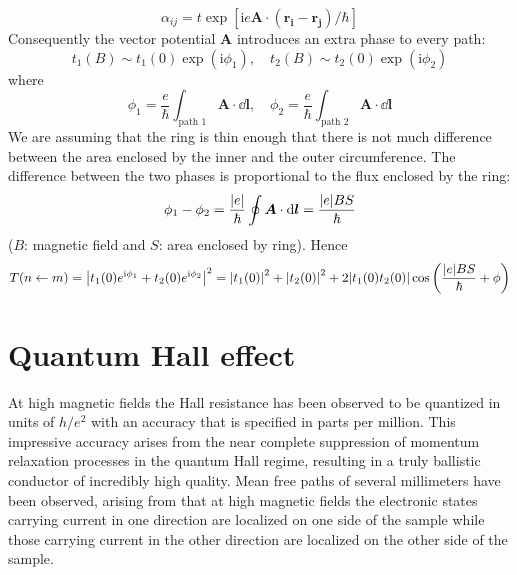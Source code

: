 \documentclass[11pt,a4paper]{book}
\theoremstyle{plain}
\theoremstyle{definition}
\theoremstyle{remark}
\newcommand{\ii}{\mathrm{i}}                      %
\renewcommand{\vec}[1]{\boldsymbol{#1}}
\begin{document}
\begin{equation}
    \alpha_{ij} = t\exp\left[\ii e \vec{A}\cdot (\vec{r_i}-\vec{r_j})/\hbar \right]
\end{equation}
Consequently the vector potential $\vec{A}$ introduces an extra phase to every path:
\begin{equation}
    t_1(B)\sim t_1(0) \exp(\ii \phi_1),\quad  t_2(B) \sim t_2(0) \exp(\ii \phi_2)
\end{equation}
where
\begin{equation}
    \phi_1 = \frac{e}{\hbar} \int_{\mbox{path 1}} \vec{A} \cdot \dd \vec{l}, \quad \phi_2 = \frac{e}{\hbar} \int_{\mbox{path 2}} \vec{A} \cdot \dd \vec{l}
\end{equation}
We are assuming that the ring is thin enough that there is not much difference between the area enclosed by the inner and the outer circumference. The difference between the two phases is proportional to the flux enclosed by the ring:
\begin{equation}
    \phi_1-\phi_2 = \frac{\abs{e}}{\hbar} \oint \vec{A} \cdot \dd \vec{l} = \frac{\abs{e} B S}{\hbar}
\end{equation}
($B$: magnetic field and $S$: area enclosed by ring). Hence
\begin{equation}
    T(n\leftarrow m) = \abs{t_1(0) e^{\ii \phi_1} + t_2(0) e^{\ii \phi_2}}^2 = \abs{t_1(0)}^2 + \abs{t_2(0)}^2 + 2 \abs{t_1(0) t_2(0)} \cos\left(\frac{\abs{e} B S}{\hbar} + \phi\right)
\end{equation}

\chapter{Quantum Hall effect}
At high magnetic fields the Hall resistance has been observed to be quantized in units of $h/e^2$ with an accuracy that is specified in parts per million. This impressive accuracy arises from the near complete suppression of momentum relaxation processes in the quantum Hall regime, resulting in a truly ballistic conductor of incredibly high quality. Mean free paths of several millimeters have been observed, arising from that at high magnetic fields the electronic states carrying current in one direction are localized on one side of the sample while those carrying current in the other direction are localized on the other side of the sample.
\end{document}
